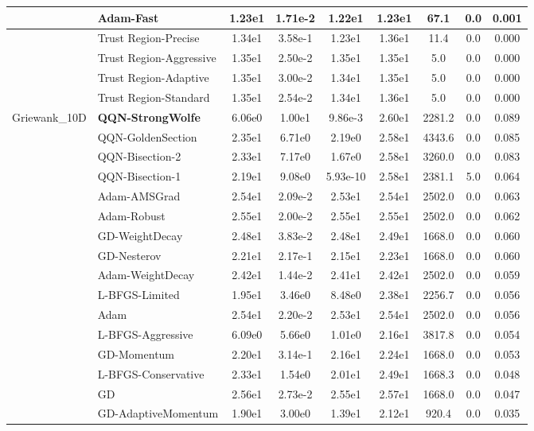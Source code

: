 \documentclass[10pt]{article}
\begin{document}
\begin{longtable}{|l|l|c|c|c|c|c|c|c|}
\hline
 & Adam-Fast & 1.23e1 & 1.71e-2 & 1.22e1 & 1.23e1 & 67.1 & 0.0 & 0.001 \\
\hline
 & Trust Region-Precise & 1.34e1 & 3.58e-1 & 1.23e1 & 1.36e1 & 11.4 & 0.0 & 0.000 \\
\hline
 & Trust Region-Aggressive & 1.35e1 & 2.50e-2 & 1.35e1 & 1.35e1 & 5.0 & 0.0 & 0.000 \\
\hline
 & Trust Region-Adaptive & 1.35e1 & 3.00e-2 & 1.34e1 & 1.35e1 & 5.0 & 0.0 & 0.000 \\
\hline
 & Trust Region-Standard & 1.35e1 & 2.54e-2 & 1.34e1 & 1.36e1 & 5.0 & 0.0 & 0.000 \\
Griewank\_10D & \textbf{QQN-StrongWolfe} & 6.06e0 & 1.00e1 & 9.86e-3 & 2.60e1 & 2281.2 & 0.0 & 0.089 \\
\hline
 & QQN-GoldenSection & 2.35e1 & 6.71e0 & 2.19e0 & 2.58e1 & 4343.6 & 0.0 & 0.085 \\
\hline
 & QQN-Bisection-2 & 2.33e1 & 7.17e0 & 1.67e0 & 2.58e1 & 3260.0 & 0.0 & 0.083 \\
\hline
 & QQN-Bisection-1 & 2.19e1 & 9.08e0 & 5.93e-10 & 2.58e1 & 2381.1 & 5.0 & 0.064 \\
\hline
 & Adam-AMSGrad & 2.54e1 & 2.09e-2 & 2.53e1 & 2.54e1 & 2502.0 & 0.0 & 0.063 \\
\hline
 & Adam-Robust & 2.55e1 & 2.00e-2 & 2.55e1 & 2.55e1 & 2502.0 & 0.0 & 0.062 \\
\hline
 & GD-WeightDecay & 2.48e1 & 3.83e-2 & 2.48e1 & 2.49e1 & 1668.0 & 0.0 & 0.060 \\
\hline
 & GD-Nesterov & 2.21e1 & 2.17e-1 & 2.15e1 & 2.23e1 & 1668.0 & 0.0 & 0.060 \\
\hline
 & Adam-WeightDecay & 2.42e1 & 1.44e-2 & 2.41e1 & 2.42e1 & 2502.0 & 0.0 & 0.059 \\
\hline
 & L-BFGS-Limited & 1.95e1 & 3.46e0 & 8.48e0 & 2.38e1 & 2256.7 & 0.0 & 0.056 \\
\hline
 & Adam & 2.54e1 & 2.20e-2 & 2.53e1 & 2.54e1 & 2502.0 & 0.0 & 0.056 \\
\hline
 & L-BFGS-Aggressive & 6.09e0 & 5.66e0 & 1.01e0 & 2.16e1 & 3817.8 & 0.0 & 0.054 \\
\hline
 & GD-Momentum & 2.20e1 & 3.14e-1 & 2.16e1 & 2.24e1 & 1668.0 & 0.0 & 0.053 \\
\hline
 & L-BFGS-Conservative & 2.33e1 & 1.54e0 & 2.01e1 & 2.49e1 & 1668.3 & 0.0 & 0.048 \\
\hline
 & GD & 2.56e1 & 2.73e-2 & 2.55e1 & 2.57e1 & 1668.0 & 0.0 & 0.047 \\
\hline
 & GD-AdaptiveMomentum & 1.90e1 & 3.00e0 & 1.39e1 & 2.12e1 & 920.4 & 0.0 & 0.035 \\

\end{longtable}
\end{document}
